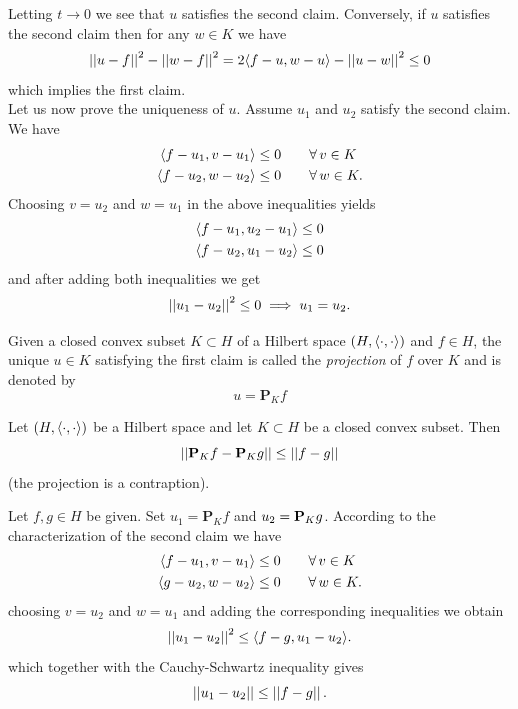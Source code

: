 \documentclass{article}
\begin{document}
\begin{fancyproof}
	Letting $t\to0$ we see that $u$ satisfies the second claim. Conversely, if $u$ satisfies the second claim then for any $w\in K$ we have
	\begin{equation*}
		\left|\left|u-f\right|\right|^{2}-\left|\left|w-f\right|\right|^{2}=2\langle f-u,w-u \rangle-\left|\left|u-w\right|\right|^{2}\leq0
	\end{equation*}
	which implies the first claim.\\
	Let us now prove the uniqueness of $u$. Assume $u_{1}$ and $u_{2}$ satisfy the second claim. We have
	\begin{align*}
		\langle f-u_{1},v-u_{1} \rangle\leq 0&\qquad\forall\, v\in K\\
		\langle f-u_{2},w-u_{2} \rangle\leq 0&\qquad\forall\, w\in K.
	\end{align*}
	Choosing $v=u_{2}$ and $w=u_{1}$ in the above inequalities yields
	\begin{align*}
		&\langle f-u_{1},u_{2}-u_{1} \rangle\leq0\\
		&\langle f-u_{2},u_{1}-u_{2} \rangle\leq0
	\end{align*}
	and after adding both inequalities we get
	\begin{equation*}
		\left|\left|u_{1}-u_{2}\right|\right|^{2}\leq 0\implies u_{1}=u_{2}.
	\end{equation*}
\end{fancyproof}
\begin{definition}
	Given a closed convex subset $K\subset H$ of a Hilbert space $\left(H,\langle \cdot,\cdot \rangle\right)$ and $f\in H$, the unique $u\in K$ satisfying the first claim is called the \textit{projection} of $f$ over $K$ and is denoted by 
	\begin{equation*}
		u=\mathbf{P}_{K}f
	\end{equation*}
\end{definition}
\begin{proposition}
	Let $\left(H,\langle \cdot,\cdot \rangle\right)$ be a Hilbert space and let $K\subset H$ be a closed convex subset. Then
	\begin{equation*}
		\left|\left|\mathbf{P}_{K}f-\mathbf{P}_{K}g\right|\right|\leq\left|\left|f-g\right|\right|
	\end{equation*}
	(the projection is a contraption).
\end{proposition}
\begin{fancyproof}
	Let $f,g\in H$ be given. Set $u_{1}=\mathbf{P}_{K}f$ and $u_{2}=\mathbf{P}_{K}g$. According to the characterization of the second claim we have
	\begin{align*}
		\langle f-u_{1},v-u_{1} \rangle\leq0&\qquad\forall\, v\in K\\
		\langle g-u_{2},w-u_{2} \rangle\leq0&\qquad\forall\, w\in K.
	\end{align*}
	choosing $v=u_{2}$ and $w=u_{1}$ and adding the corresponding inequalities we obtain
	\begin{equation*}
		\left|\left|u_{1}-u_{2}\right|\right|^{2}\leq\langle f-g,u_{1}-u_{2} \rangle. 
	\end{equation*}
	which together with the Cauchy-Schwartz inequality gives 
	\begin{equation*}
		\left|\left|u_{1}-u_{2}\right|\right|\leq\left|\left|f-g\right|\right|.
	\end{equation*}
\end{fancyproof}
\end{document}
